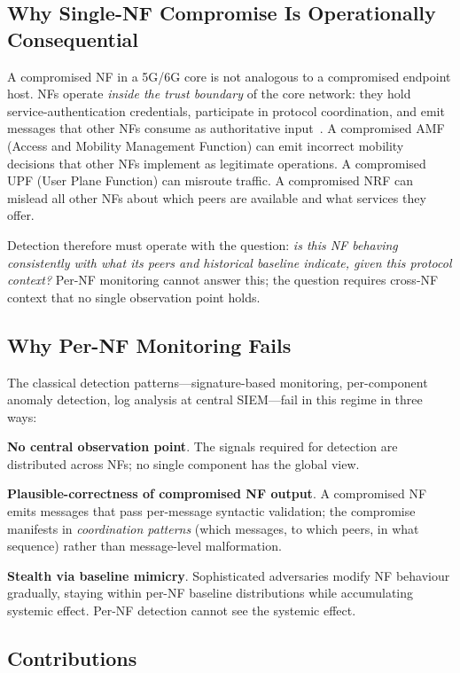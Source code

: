 \documentclass[sigconf,nonacm]{acmart}
\begin{document}
\subsection{Why Single-NF Compromise Is Operationally Consequential}

A compromised NF in a 5G/6G core is not analogous to a
compromised endpoint host. NFs operate \emph{inside the trust
boundary} of the core network: they hold service-authentication
credentials, participate in protocol coordination, and emit
messages that other NFs consume as authoritative
input~\cite{moustafa2024nidssurv,park2024sbathreat}. A compromised
AMF (Access and Mobility Management Function) can emit incorrect
mobility decisions that other NFs implement as legitimate
operations. A compromised UPF (User Plane Function) can misroute
traffic. A compromised NRF can mislead all other NFs about which
peers are available and what services they offer.

Detection therefore must operate with the question: \emph{is this
NF behaving consistently with what its peers and historical
baseline indicate, given this protocol context?} Per-NF
monitoring cannot answer this; the question requires
cross-NF context that no single observation point holds.

\subsection{Why Per-NF Monitoring Fails}

The classical detection patterns---signature-based monitoring,
per-component anomaly detection, log analysis at central
SIEM---fail in this regime in three ways:

\textbf{No central observation point}. The signals required for
detection are distributed across NFs; no single component has
the global view.

\textbf{Plausible-correctness of compromised NF output}. A
compromised NF emits messages that pass per-message
syntactic validation; the compromise manifests in
\emph{coordination patterns} (which messages, to which peers,
in what sequence) rather than message-level malformation.

\textbf{Stealth via baseline mimicry}. Sophisticated adversaries
modify NF behaviour gradually, staying within per-NF baseline
distributions while accumulating systemic effect. Per-NF
detection cannot see the systemic effect.

\subsection{Contributions}
\end{document}
